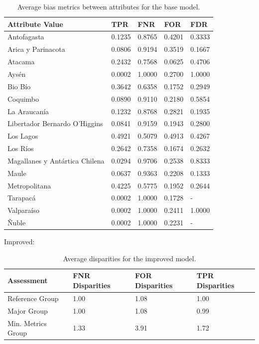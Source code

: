 \documentclass[twoside,11pt]{article}
\begin{document}
\begin{table}[ht]
\centering
\begin{tabular}{|p{3.5cm}|p{1cm}|p{1cm}|p{1cm}|p{1cm}|}
\hline

               \textbf{Attribute Value} &    \textbf{TPR} &    \textbf{FNR} &    \textbf{FOR} &    \textbf{FDR} \\ \hline

                   Antofagasta & 0.1235 & 0.8765 & 0.4201 & 0.3333 \\
            Arica y Parinacota & 0.0806 & 0.9194 & 0.3519 & 0.1667 \\
                       Atacama & 0.2432 & 0.7568 & 0.0625 & 0.4706 \\
                         Aysén & 0.0002 & 1.0000 & 0.2700 & 1.0000 \\
                       Bio Bío & 0.3642 & 0.6358 & 0.1752 & 0.2949 \\
                      Coquimbo & 0.0890 & 0.9110 & 0.2180 & 0.5854 \\
                  La Araucanía & 0.1232 & 0.8768 & 0.2821 & 0.1935 \\
 Libertador Bernardo O'Higgins & 0.0841 & 0.9159 & 0.1943 & 0.2800 \\
                     Los Lagos & 0.4921 & 0.5079 & 0.4913 & 0.4267 \\
                      Los Ríos & 0.2642 & 0.7358 & 0.1674 & 0.2632 \\
Magallanes y Antártica Chilena & 0.0294 & 0.9706 & 0.2538 & 0.8333 \\
                         Maule & 0.0637 & 0.9363 & 0.2208 & 0.1333 \\
                 Metropolitana & 0.4225 & 0.5775 & 0.1952 & 0.2644 \\
                      Tarapacá & 0.0002 & 1.0000 & 0.1728 &     - \\
                    Valparaíso & 0.0002 & 1.0000 & 0.2411 & 1.0000 \\
                         Ñuble & 0.0002 & 1.0000 & 0.2231 &     - \\

\hline
\end{tabular}
\caption{Average bias metrics between attributes for the base model.}
\end{table}


Improved:

\begin{table}[!htb]
\centering
\begin{tabular}{|p{70pt}|p{2cm}|p{2cm}|p{2cm}|}
\hline
        \textbf{Assessment} & \textbf{FNR \break Disparities} & \textbf{FOR \break Disparities} & \textbf{TPR \break Disparities} \\ \hline
        Reference Group & 1.00 & 1.08 & 1.00   \\ 
        Major Group & 1.00 & 1.08 & 0.99  \\ 
        Min. Metrics Group & 1.33 & 3.91 & 1.72 \\ 
        \hline
    \end{tabular}
\caption{Average disparities for the improved model.}
\end{table}
\end{document}
